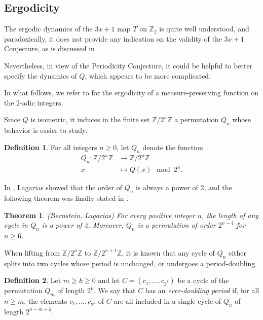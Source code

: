 \documentclass[12pt]{article}
\newtheorem{theorem}{Theorem}
\theoremstyle{definition}
\newtheorem{definition}{Definition}
\begin{document}
\subsection{Ergodicity}
\label{sub:erg}
The ergodic dynamics of the $3x+1$ map $T$ on $\mathbb{Z}_2$ is quite well understood, and paradoxically, it does not provide any indication on the validity of the $3x+1$ Conjecture, as is discussed in \cite{Aki04}.

Nevertheless, in view of the Periodicity Conjecture, it could be helpful to better specify the dynamics of $Q$, which appears to be more complicated.

In what follows, we refer to \cite{Ana06} for the ergodicity of a measure-preserving function on the 2-adic integers.

Since $Q$ is isometric, it induces in the finite set $\mathbb{Z}/2^n\mathbb{Z}$ a permutation $Q_n$ whose behavior is easier to study.
\begin{definition}
For all integers $n \geq 0$, let $Q_n$ denote the function
$$ \begin{array}{rl}Q_n:  \mathbb{Z}/2^n\mathbb{Z} & \longrightarrow \mathbb{Z}/2^n\mathbb{Z}\\
 x & \longmapsto Q(x) \mod 2^n. \end{array}$$
\end{definition}

In \cite{Lag85}, Lagarias showed that the order of $Q_n$ is always a power of 2, and the following theorem was finally stated in \cite{Ber96}.

\begin{theorem} {\em (Bernstein, Lagarias)} \label{th:Qn_cycles}
For every positive integer $n$, the length of any cycle in $Q_n$ is a power of 2. Moreover, $Q_n$ is a permutation of order $2^{n-4}$ for $n \geq 6$.
\end{theorem}

When lifting from $\mathbb{Z}/2^n\mathbb{Z}$ to $\mathbb{Z}/2^{n+1}\mathbb{Z}$, it is known that any cycle of $Q_n$  either splits into two cycles whose period is unchanged, or undergoes a period-doubling.
\begin{definition} \label{def:edp_cycle}
Let $m \geq k \geq 0$ and let $C= (c_{1}, \ldots, c_{2^k})$ be a cycle of the permutation $Q_m$ of length $2^k$. We say that $C$ has an \textit{ever-doubling period} if, for all $n \geq m$, the elements $c_1, \ldots, c_{2^k}$ of $C$ are all included in a single cycle of $Q_n$ of length $2^{n-m+k}$.
\end{definition}
\end{document}
